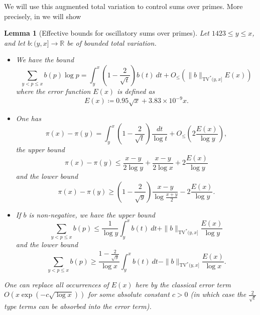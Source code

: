 \documentclass[10pt,a4paper,reqno]{amsart}
\numberwithin{equation}{section}
\theoremstyle{plain}
\newtheorem{lemma}[lemma]{Lemma}
\theoremstyle{definition}
\newcommand\R{\mathbb{R}}
\begin{document}
We will use this augmented total variation to control sums over primes.  More precisely, in  we will show

\begin{lemma}[Effective bounds for oscillatory sums over primes]\label{osc-lemma}  Let $1423 \leq y \leq x$, and let $b: (y,x] \to \R$ be of bounded total variation.
  \begin{itemize}
    \item [(i)] We have the bound
\begin{equation}\label{bv-exact}
    \sum_{y < p \leq x} b(p) \log p = \int_y^x \left(1-\frac{2}{\sqrt{t}}\right) b(t)\ dt + O_{\leq}(\|b\|_{\mathrm{TV}^*(y,x]} E(x))
\end{equation}
where the error function $E(x)$ is defined as
\begin{equation}\label{tilde-e}
  E(x) \coloneqq 0.95 \sqrt{x} + 3.83 \times 10^{-9} x.
\end{equation}
  \item[(ii)] One has
\begin{equation}\label{pix}
  \pi(x) - \pi(y) = \int_y^x \left(1-\frac{2}{\sqrt{t}}\right)\frac{dt}{\log t} + O_\leq\left(2 \frac{E(x)}{\log y}\right),
\end{equation}
the upper bound
\begin{equation}\label{pixy-upper}
 \pi(x) - \pi(y) \leq \frac{x-y}{2\log y} + \frac{x-y}{2\log x} + 2 \frac{E(x)}{\log y}
\end{equation}
and the lower bound
\begin{equation}\label{pixy-lower}
  \pi(x) - \pi(y) \geq \left(1-\frac{2}{\sqrt{y}}\right) \frac{x-y}{\log \frac{x+y}{2}} - 2 \frac{E(x)}{\log y}.
\end{equation}
  \item[(iii)] If $b$ is non-negative, we have the upper bound
\begin{equation}\label{bv-upper}
   \sum_{y < p \leq x} b(p) \leq \frac{1}{\log y} \int_y^x b(t)\ dt + \|b\|_{\mathrm{TV}^*(y,x]} \frac{E(x)}{\log y}
\end{equation}
and the lower bound
\begin{equation}\label{bv-lower}
  \sum_{y < p \leq x} b(p) \geq \frac{1-\frac{2}{\sqrt{y}}}{\log x} \int_y^x b(t)\ dt - \|b\|_{\mathrm{TV}^*(y,x]} \frac{E(x)}{\log x}.
\end{equation}
\end{itemize}
One can replace all occurrences of $E(x)$ here by the classical error term $O(x \exp(-c \sqrt{\log x}))$ for some absolute constant $c>0$ (in which case the $\frac{2}{\sqrt{t}}$ type terms can be absorbed into the error term).
\end{lemma}
\end{document}

